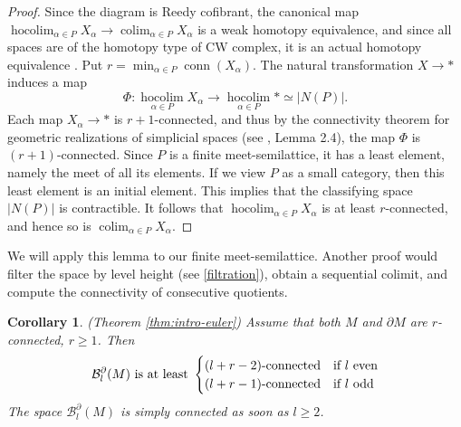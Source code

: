 \documentclass[11pt,a4paper]{article}
\numberwithin{equation}{section}
\newtheorem{cor}[thm]{Corollary}
\theoremstyle{definition}
\theoremstyle{remark}
\newcommand{\pa}{\partial}
\newcommand{\BB}{\mathcal B}
\newcommand{\conn}{\operatorname{conn}}
\begin{document}
\begin{proof}
Since the diagram is Reedy cofibrant, the canonical map
$
\operatorname*{hocolim}_{\alpha\in P}X_\alpha
\longrightarrow
\operatorname*{colim}_{\alpha\in P}X_\alpha
$
is a weak homotopy equivalence, and since all spaces are of the homotopy type of CW complex, it is an actual homotopy equivalence \cite{piacenza}.
Put
$
r=\min_{\alpha\in P}\conn(X_\alpha)
$.
The natural transformation \(X\to *\) induces a map
\[
\Phi : \operatorname*{hocolim}_{\alpha\in P}X_\alpha
\longrightarrow
\operatorname*{hocolim}_{\alpha\in P}*
\simeq |N(P)|.
\]
Each map $X_\alpha\rightarrow *$ is $r+1$-connected, and thus
by the connectivity theorem for geometric realizations of simplicial
spaces (see \cite{ebertwilliams}, Lemma 2.4), the map $\Phi$ is \((r+1)\)-connected.
Since \(P\) is a finite meet-semilattice, it has a least element, namely
the meet of all its elements. If we view $P$ as a small category, then this least element is an initial element. This implies that the classifying space \(|N(P)|\) is contractible. It
follows that
$
\operatorname*{hocolim}_{\alpha\in P}X_\alpha
$
is at least \(r\)-connected, and hence so is $
\operatorname*{colim}_{\alpha\in P}X_\alpha$.
\end{proof}

We will apply this lemma to our finite meet-semilattice. Another proof would filter the space by level height (see \eqref{filtration}), obtain a sequential colimit, and compute the connectivity of consecutive quotients.

\begin{cor}\label{prop:connectivity} (Theorem \ref{thm:intro-euler})
Assume that both \(M\) and \(\pa M\) are \(r\)-connected, $r\geq 1$. Then 
\begin{equation}\label{eq:connectivity-corollary}
\BB_l^{\pa}(M)\text{ is at least}\ \begin{cases}(l+r-2)\text{-connected}& \hbox{if $l$ even}\\
(l+r-1)\text{-connected}& \hbox{if $l$ odd}
\end{cases}
\end{equation} 
The space $\BB_l^\pa (M)$ is simply connected as soon as $l\ge 2$.
\end{cor}
\end{document}
